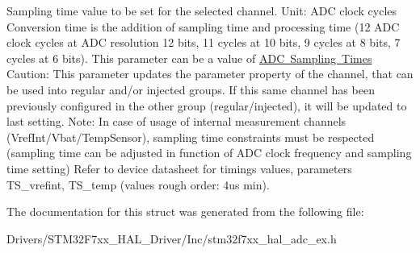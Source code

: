 Sampling time value to be set for the selected channel. Unit\+: A\+DC clock cycles Conversion time is the addition of sampling time and processing time (12 A\+DC clock cycles at A\+DC resolution 12 bits, 11 cycles at 10 bits, 9 cycles at 8 bits, 7 cycles at 6 bits). This parameter can be a value of \mbox{\hyperlink{group___a_d_c__sampling__times}{A\+DC Sampling Times}} Caution\+: This parameter updates the parameter property of the channel, that can be used into regular and/or injected groups. If this same channel has been previously configured in the other group (regular/injected), it will be updated to last setting. Note\+: In case of usage of internal measurement channels (Vref\+Int/\+Vbat/\+Temp\+Sensor), sampling time constraints must be respected (sampling time can be adjusted in function of A\+DC clock frequency and sampling time setting) Refer to device datasheet for timings values, parameters T\+S\+\_\+vrefint, T\+S\+\_\+temp (values rough order\+: 4us min). 

The documentation for this struct was generated from the following file\+:\begin{DoxyCompactItemize}
\item 
Drivers/\+S\+T\+M32\+F7xx\+\_\+\+H\+A\+L\+\_\+\+Driver/\+Inc/stm32f7xx\+\_\+hal\+\_\+adc\+\_\+ex.\+h\end{DoxyCompactItemize}

